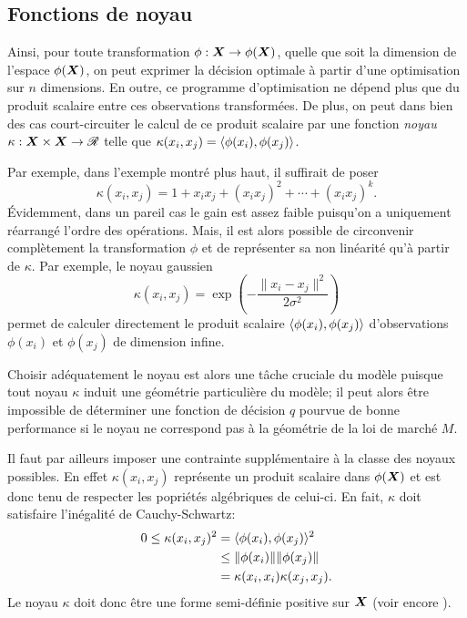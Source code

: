 \subsection{Fonctions de noyau}

Ainsi, pour toute transformation $\phi:\bm{X}\to\phi(\bm{X})$, quelle que soit la dimension de l'espace
$\phi(\bm{X})$, on peut exprimer la décision optimale à partir d'une optimisation sur $n$
dimensions. En outre, ce programme d'optimisation ne dépend plus que du produit scalaire
entre ces observations transformées. De plus, on peut dans bien des cas court-circuiter le
calcul de ce produit scalaire par une fonction \textit{noyau} $\kappa:\bm{X}\times\bm{X} \to \mathscr{R}$ telle que
$\kappa(x_i,x_j) = \langle\phi(x_i),\phi(x_j)\rangle$.

Par exemple, dans l'exemple montré plus haut, il suffirait de poser
\begin{equation}
  \kappa(x_i,x_j) = 1 + x_ix_j + (x_ix_j)^2 + \cdots + (x_ix_j)^k.
\end{equation}
Évidemment, dans un pareil cas le gain est assez faible puisqu'on a uniquement réarrangé
l'ordre des opérations. Mais, il est alors possible de circonvenir complètement la
transformation $\phi$ et de représenter sa non linéarité qu'à partir de $\kappa$.  Par exemple, le
noyau gaussien
\begin{equation}
  \kappa(x_i,x_j) = \exp\left(-\frac{\|x_i-x_j\|^2}{2\sigma^2}\right)
\end{equation}
permet de calculer directement le produit scalaire $\langle\phi(x_i),\phi(x_j)\rangle$ d'observations
$\phi(x_i)$ et $\phi(x_j)$ de dimension infine.

Choisir adéquatement le noyau est alors une tâche cruciale du modèle puisque tout noyau
$\kappa$ induit une géométrie particulière du modèle; il peut alors être impossible de
déterminer une fonction de décision $q$ pourvue de bonne performance si le noyau ne
correspond pas à la géométrie de la loi de marché $M$.

Il faut par ailleurs imposer une contrainte supplémentaire à la classe des noyaux
possibles. En effet $\kappa(x_i,x_j)$ représente un produit scalaire dans $\phi(\bm{X})$ et est donc
tenu de respecter les popriétés algébriques de celui-ci. En fait, $\kappa$ doit satisfaire
l'inégalité de Cauchy-Schwartz:
\begin{align}
  0 \leq \kappa(x_i,x_j)^2 &= \langle\phi(x_i),\phi(x_j)\rangle^2\\
               &\leq \|\phi(x_i)\|\|\phi(x_j)\|\\
               &= \kappa(x_i,x_i)\kappa(x_j,x_j).
\end{align}
Le noyau $\kappa$ doit donc être une forme semi-définie positive sur $\bm{X}$ (voir encore
\cite{mohri2012foundations}).


